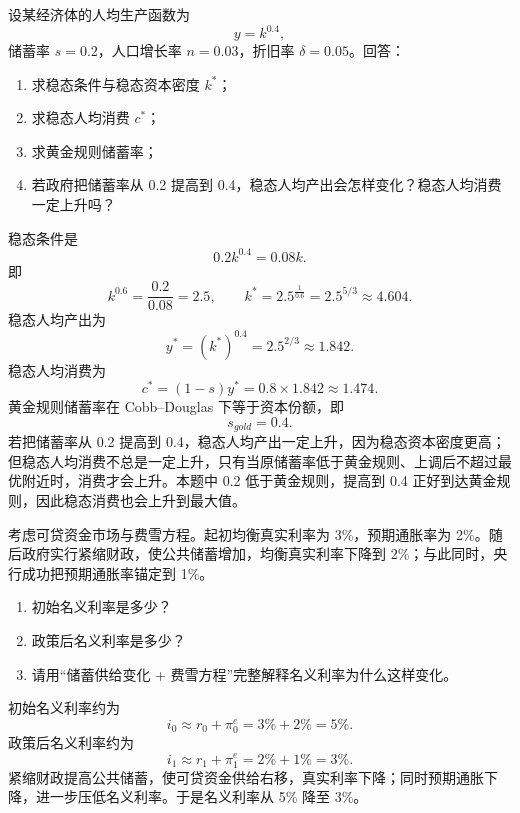 \begin{question}
设某经济体的人均生产函数为
\[
y=k^{0.4},
\]
储蓄率 $s=0.2$，人口增长率 $n=0.03$，折旧率 $\delta=0.05$。回答：
\begin{enumerate}[label=(\alph*),leftmargin=2.5em]
  \item 求稳态条件与稳态资本密度 $k^*$；
  \item 求稳态人均消费 $c^*$；
  \item 求黄金规则储蓄率；
  \item 若政府把储蓄率从 0.2 提高到 0.4，稳态人均产出会怎样变化？稳态人均消费一定上升吗？
\end{enumerate}
\begin{solution}
稳态条件是
\[
0.2k^{0.4}=0.08k.
\]
即
\[
k^{0.6}=\frac{0.2}{0.08}=2.5,
\qquad
k^*=2.5^{\frac{1}{0.6}}=2.5^{5/3}\approx 4.604.
\]
稳态人均产出为
\[
y^*=(k^*)^{0.4}=2.5^{2/3}\approx 1.842.
\]
稳态人均消费为
\[
c^*=(1-s)y^*=0.8\times1.842\approx 1.474.
\]
黄金规则储蓄率在 Cobb--Douglas 下等于资本份额，即
\[
s_{gold}=0.4.
\]
若把储蓄率从 0.2 提高到 0.4，稳态人均产出一定上升，因为稳态资本密度更高；但稳态人均消费不总是一定上升，只有当原储蓄率低于黄金规则、上调后不超过最优附近时，消费才会上升。本题中 0.2 低于黄金规则，提高到 0.4 正好到达黄金规则，因此稳态消费也会上升到最大值。
\end{solution}
\end{question}

\begin{question}
考虑可贷资金市场与费雪方程。起初均衡真实利率为 3\%，预期通胀率为 2\%。随后政府实行紧缩财政，使公共储蓄增加，均衡真实利率下降到 2\%；与此同时，央行成功把预期通胀率锚定到 1\%。
\begin{enumerate}[label=(\alph*),leftmargin=2.5em]
  \item 初始名义利率是多少？
  \item 政策后名义利率是多少？
  \item 请用“储蓄供给变化 + 费雪方程”完整解释名义利率为什么这样变化。
\end{enumerate}
\begin{solution}
初始名义利率约为
\[
i_0\approx r_0+\pi^e_0=3\%+2\%=5\%.
\]
政策后名义利率约为
\[
i_1\approx r_1+\pi^e_1=2\%+1\%=3\%.
\]
紧缩财政提高公共储蓄，使可贷资金供给右移，真实利率下降；同时预期通胀下降，进一步压低名义利率。于是名义利率从 5\% 降至 3\%。
\end{solution}
\end{question}

